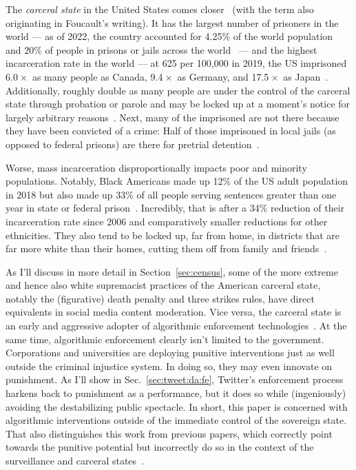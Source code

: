 The \emph{carceral state} in the United States comes closer~\cite{Simon2007}
(with the term also originating in Foucault's writing). It has the largest
number of prisoners in the world — as of 2022, the country accounted for 4.25\%
of the world population~\cite{Worldometer2023} and 20\% of people in prisons or
jails across the world~\cite{SawyerWagner2022} — and the highest incarceration
rate in the world — at 625 per 100,000 in 2019, the US imprisoned
6.0$\mspace{1mu}\times$ as many people as Canada, 9.4$\mspace{1mu}\times$ as
Germany, and 17.5$\mspace{1mu}\times$ as Japan~\cite{WorldPrisonBrief2023}.
Additionally, roughly double as many people are under the control of the
carceral state through probation or parole and may be locked up at a moment's
notice for largely arbitrary reasons~\cite{SawyerWagner2022}. Next, many of the
imprisoned are not there because they have been convicted of a crime: Half of
those imprisoned in local jails (as opposed to federal prisons) are there for
pretrial detention~\cite{SawyerWagner2022}.

Worse, mass incarceration disproportionally impacts poor and minority
populations. Notably, Black Americans made up 12\% of the US adult population in
2018 but also made up 33\% of all people serving sentences greater than one year
in state or federal prison~\cite{Gramlich2020}. Incredibly, that is after a 34\%
reduction of their incarceration rate since 2006 and comparatively smaller
reductions for other ethnicities. They also tend to be locked up, far from home,
in districts that are far more white than their homes, cutting them off from
family and friends~\cite{WagnerKopf2015}.

As I'll discuss in more detail in Section~\ref{sec:census}, some of the more
extreme and hence also white supremacist practices of the American carceral
state, notably the (figurative) death penalty and three strikes rules, have
direct equivalents in social media content moderation. Vice versa, the carceral
state is an early and aggressive adopter of algorithmic enforcement
technologies~\cite{AngwinLarsonea2016,EPIC2020,Hao2019,ReddenODonovanDixea2020,Yampolskiy2016}.
At the same time, algorithmic enforcement clearly isn't limited to the
government. Corporations and universities are deploying punitive interventions
just as well outside the criminal injustice system. In doing so, they may even
innovate on punishment. As I'll show in Sec.~\ref{sec:tweet:da:fe}, Twitter's
enforcement process harkens back to punishment as a performance, but it does so
while (ingeniously) avoiding the destabilizing public spectacle. In short, this
paper is concerned with algorithmic interventions outside of the immediate
control of the sovereign state. That also distinguishes this work from previous
papers, which correctly point towards the punitive potential but incorrectly do
so in the context of the surveillance and carceral
states~\cite{DehlendorfGerety2021,McElroyWhittakerea2021}.

